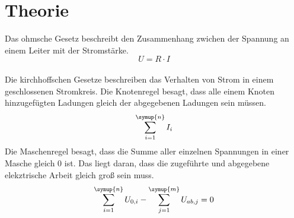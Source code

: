 \section{Theorie}
\label{sec:Theorie}
    Das ohmsche Gesetz beschreibt den Zusammenhang zwichen der Spannung an einem Leiter mit der Stromstärke.
    \begin{equation}
        U=R \cdot I
        \label{eqn:ohm}
    \end{equation}\\
    Die kirchhoffschen Gesetze beschreiben das Verhalten von Strom in einem geschlossenen Stromkreis.
    Die Knotenregel besagt, dass alle einem Knoten hinzugefügten Ladungen gleich der abgegebenen Ladungen sein müssen.
    \begin{equation}
        \sum_{i=1}^{\symup{n}}{I_i}
        \label{eqn:knoten}
    \end{equation}
    Die Maschenregel besagt, dass die Summe aller einzelnen Spannungen in einer Masche gleich 0 ist. 
    Das liegt daran, dass die zugeführte und abgegebene elekztrische Arbeit gleich groß sein muss.
    \begin{equation}
        \sum_{i=1}^{\symup{n}}{U_{0,i}} - \sum_{j=1}^{\symup{m}}{U_{ab,j}} =0
    \end{equation}
\cite{sample}
